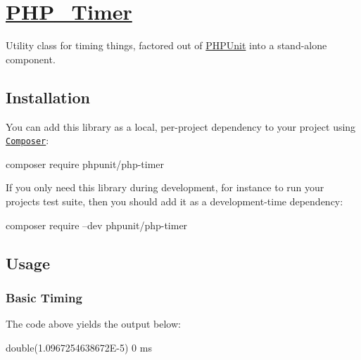 \href{https://travis-ci.org/sebastianbergmann/php-timer}{\tt }

\section*{\mbox{\hyperlink{class_p_h_p___timer}{P\+H\+P\+\_\+\+Timer}}}

Utility class for timing things, factored out of \mbox{\hyperlink{namespace_p_h_p_unit}{P\+H\+P\+Unit}} into a stand-\/alone component.

\subsection*{Installation}

You can add this library as a local, per-\/project dependency to your project using \href{https://getcomposer.org/}{\tt Composer}\+: \begin{DoxyVerb}composer require phpunit/php-timer
\end{DoxyVerb}


If you only need this library during development, for instance to run your project\textquotesingle{}s test suite, then you should add it as a development-\/time dependency\+: \begin{DoxyVerb}composer require --dev phpunit/php-timer
\end{DoxyVerb}


\subsection*{Usage}

\subsubsection*{Basic Timing}




The code above yields the output below\+: \begin{DoxyVerb}double(1.0967254638672E-5)
0 ms
\end{DoxyVerb}



